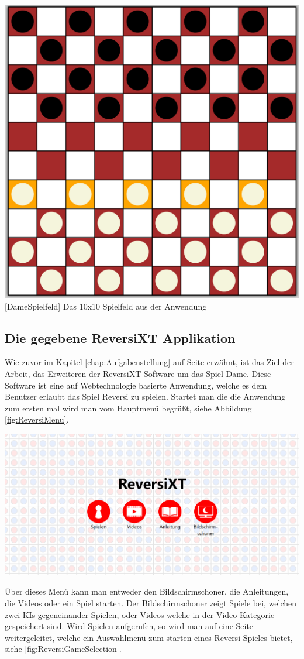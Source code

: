 \documentclass[12pt,a4paper,bibliography=totocnumbered,listof=totocnumbered]{article}
\begin{document}
\vspace{1em}
\begin{minipage}{\linewidth}
	\centering
	\includegraphics[width=0.5\linewidth]{pics/checkersboard.png}
	[DameSpielfeld]{ Das 10x10 Spielfeld aus der Anwendung }
	\label{fig:checkersboard}
\end{minipage}

\subsection{Die gegebene ReversiXT Applikation}
Wie zuvor im Kapitel \ref{chap:Aufgabenstellung} auf Seite \pageref{chap:Aufgabenstellung} erwähnt, ist das Ziel der Arbeit, das Erweiteren
der ReversiXT Software um das Spiel Dame. Diese Software ist eine auf Webtechnologie basierte Anwendung, welche es dem Benutzer erlaubt
das Spiel Reversi zu spielen. Startet man die die Anwendung zum ersten mal wird man vom Hauptmenü begrüßt, siehe Abbildung \ref{fig:ReversiMenu}.


\vspace{1em}
\begin{minipage}{\linewidth}
	\centering
	\includegraphics[width=0.7\linewidth]{pics/ReversiMenues.png}
	\label{fig:ReversiMenu}
\end{minipage}

Über dieses Menü kann man entweder den Bildschirmschoner, die Anleitungen, die Videos oder ein Spiel starten. Der Bildschirmschoner 
zeigt Spiele bei, welchen zwei KIs gegeneinander Spielen, oder Videos welche in der Video Kategorie gespeichert sind. Wird Spielen aufgerufen, 
so wird man auf eine Seite weitergeleitet, welche ein Auswahlmenü zum starten eines Reversi Spieles bietet, siehe \ref{fig:ReversiGameSelection}.
\end{document}
